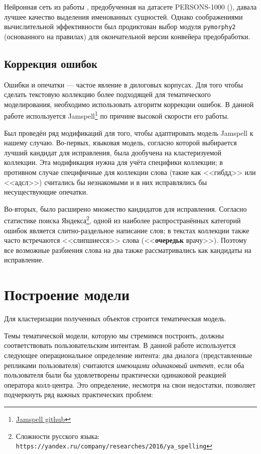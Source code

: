 Нейронная сеть из работы \cite{burtsev}, предобученная на датасете PERSONS-1000 (\cite{persona}), давала лучшее качество выделения именованных сущностей. Однако соображениями вычислительной эффективности был продиктован выбор модуля \texttt{pymorphy2} (основанного на правилах) для окончательной версии конвейера предобработки.

\subsection{Коррекция ошибок}

\par Ошибки и опечатки --- частое явление в дилоговых корпусах. Для того чтобы сделать текстовую коллекцию более подходящей для тематического моделирования, необходимо использовать алгоритм коррекции ошибок. В данной работе используется Jamspell\footnote{\href{https://github.com/bakwc/JamSpell}{Jamspell github}} по причине высокой скорости его работы.

\par Был проведён ряд модификаций для того, чтобы адаптировать модель Jamspell к нашему случаю. Во-первых, языковая модель, согласно которой выбирается лучший кандидат для исправления, была дообучена на кластеризуемой коллекции. Эта модификация нужна для учёта специфики коллекции; в противном случае специфичные для коллекции слова (такие как <<гибдд>> или <<адсл>>) считались бы незнакомыми и в них исправлялись бы несуществующие опечатки.

Во-вторых, было расширено множество кандидатов для исправления. Согласно статистике поиска Яндекса\footnote{Сложности русского языка: \texttt{https://yandex.ru/company/researches/2016/ya\_spelling}}, одной из наиболее распространённых категорий ошибок является слитно-раздельное написание слов; в текстах коллекции также часто встречаются <<слипшиесся>> слова (<<\textbf{очередьк} врачу>>). Поэтому все возможные разбиения слова на два также рассматривались как кандидаты на исправление.

\section{Построение модели}
Для кластеризации полученных объектов строится тематическая модель. \par Темы тематической модели, которую мы стремимся построить, должны соответствовать пользовательским интентам. В данной работе используется следующее операциональное определение интента: два диалога (представленные репликами пользователя) считаются \textit{имеющими одинаковый интент}, если оба пользователя были бы удовлетворены практически одинаковой реакцией оператора колл-центра. Это определение, несмотря на свои недостатки, позволяет подчеркнуть ряд важных практических проблем:

